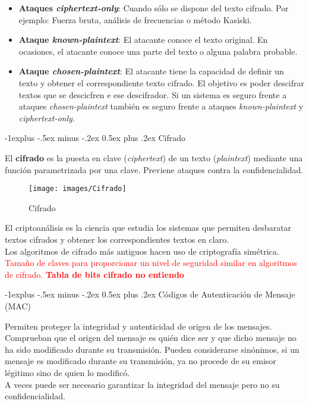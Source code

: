 \documentclass[10pt,portrait, twocolumn]{article}
\makeatletter
\renewcommand{\subsection}{\@startsection{subsection}{2}{0mm}%
                                {-1explus -.5ex minus -.2ex}%
                                {0.5ex plus .2ex}%
                                {\normalfont\normalsize\bfseries}}
\makeatother
\begin{document}
	\begin{itemize}
		\item \textbf{Ataques \textit{ciphertext-only}}: Cuando sólo se dispone del texto cifrado. Por ejemplo: Fuerza bruta, análisis de frecuencias o método Kasiski.
		\item \textbf{Ataque \textit{known-plaintext}}: El atacante conoce el texto original. En ocasiones, el atacante conoce una parte del texto o alguna palabra probable.
		\item \textbf{Ataque \textit{chosen-plaintext}}: El atacante tiene la capacidad de definir un texto y obtener el correspondiente texto cifrado. El objetivo es poder descifrar textos que se descicfren e ese descifrador. Si un sistema es seguro frente a ataques \textit{chosen-plaintext} también es seguro frente a ataques \textit{known-plaintext} y \textit{ciphertext-only}.
	\end{itemize}

	
	\subsection{Cifrado}
	
El \textbf{cifrado} es la puesta en clave (\textit{ciphertext}) de un texto (\textit{plaintext}) mediante una función parametrizada por una clave. Previene ataques contra la confidencialidad.

	\begin{figure}[ht!]
	\centering
	\texttt{[image: images/Cifrado]}
	\caption{Cifrado}
	\label{fig:Triada}
	\end{figure}
	
El criptoanálisis es la ciencia que estudia los sistemas que permiten desbaratar textos cifrados y obtener los correspondientes textos en claro.\\

Los algoritmos de cifrado más antiguos hacen uso de criptografía simétrica.\\

\textcolor{red}{Tamaño de claves para proporcionar un nivel de seguridad similar en algoritmos de cifrado. \textbf{Tabla de bits cifrado no entiendo}}
	
\subsection{Códigos de Autenticación de Mensaje (MAC)}

Permiten proteger la integridad y autenticidad de origen de los mensajes. Comprueban que el origen del mensaje es quién dice ser y que dicho mensaje no ha sido modificado durante su transmisión. Pueden considerarse sinónimos, si un mensaje es modificado durante su transmisión, ya no procede de su emisor légitimo sino de quien lo modificó.\\
\quad A veces puede ser necesario garantizar la integridad del mensaje pero no su confidencialidad.\\
\end{document}
